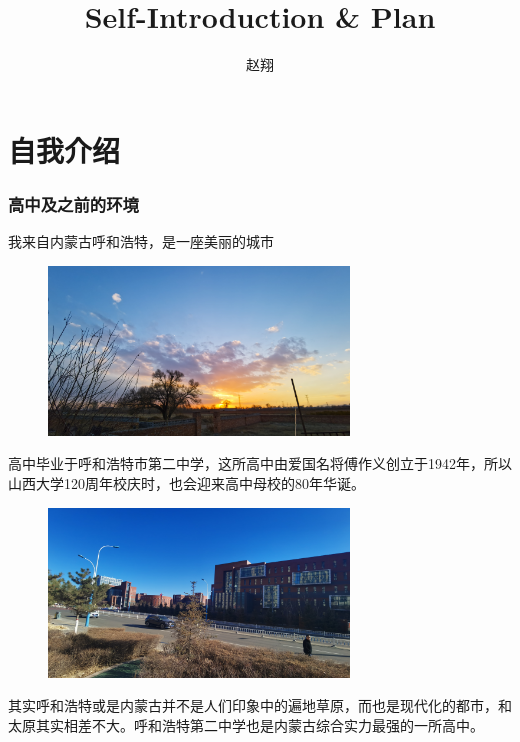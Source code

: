 \documentclass[hyperref,UTF8]{ctexart}
\title{Self-Introduction \& Plan}
\author{赵翔}
\begin{document}
\maketitle
\part{自我介绍}
\section{高中及之前的环境}
我来自内蒙古呼和浩特，是一座美丽的城市
\begin{figure}[H]
    \centering
    \includegraphics[width=8cm]{IMG_20210206_174128.jpg}
\end{figure}
高中毕业于呼和浩特市第二中学，这所高中由爱国名将傅作义创立于1942年，所以山西大学120周年校庆时，也会迎来高中母校的80年华诞。
\begin{figure}[H]
    \centering
    \includegraphics[width=8cm]{IMG_20210207_152437.jpg}
\end{figure}
其实呼和浩特或是内蒙古并不是人们印象中的遍地草原，而也是现代化的都市，和太原其实相差不大。呼和浩特第二中学也是内蒙古综合实力最强的一所高中。
\end{document}
